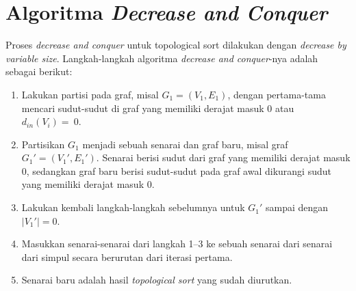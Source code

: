 \documentclass{article}
\begin{document}
\section{Algoritma \textit{Decrease and Conquer}}
Proses \textit{decrease and conquer} untuk topological sort dilakukan dengan
\textit{decrease by variable size}. Langkah-langkah algoritma \textit{decrease
and conquer}-nya adalah sebagai berikut:
\begin{enumerate}
  \item Lakukan partisi pada graf, misal $G_1 = (V_1, E_1)$, dengan
    pertama-tama mencari sudut-sudut di graf yang memiliki derajat masuk 0 atau
    $d_{in}(V_i) =~0$.
  \item Partisikan $G_1$ menjadi sebuah senarai dan graf baru, misal graf $G_1'
    = (V_1', E_1')$.  Senarai berisi sudut dari graf yang memiliki derajat
    masuk 0, sedangkan graf baru berisi sudut-sudut pada graf awal dikurangi
    sudut yang memiliki derajat masuk 0.
  \item Lakukan kembali langkah-langkah sebelumnya untuk $G_1'$ sampai dengan
    $|V_1'| = 0$.
  \item Masukkan senarai-senarai dari langkah 1--3 ke sebuah senarai dari
    senarai dari simpul secara berurutan dari iterasi pertama.
  \item Senarai baru adalah hasil \textit{topological sort} yang sudah
    diurutkan.
\end{enumerate}
\end{document}
